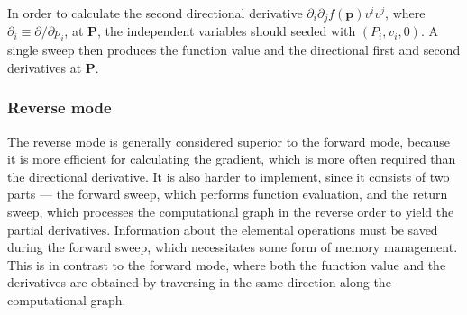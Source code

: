 \documentclass{article}
\begin{document}
In order to calculate the second directional derivative
$\partial_i\partial_j f(\bm p) v^iv^j$, where
$\partial_i \equiv \partial/\partial p_i$, at $\bm P$, the independent
variables should seeded with $(P_i, v_i, 0)$. A single sweep then
produces the function value and the directional first and second
derivatives at $\bm P$.

\subsubsection{Reverse mode}

The reverse mode is generally considered superior to the forward mode,
because it is more efficient for calculating the gradient, which is
more often required than the directional derivative. It is also harder
to implement, since it consists of two parts --- the forward sweep,
which performs function evaluation, and the return sweep, which
processes the computational graph in the reverse order to yield the
partial derivatives. Information about the elemental operations must
be saved during the forward sweep, which necessitates some form of
memory management. This is in contrast to the forward mode, where both
the function value and the derivatives are obtained by traversing in
the same direction along the computational graph.
\end{document}
